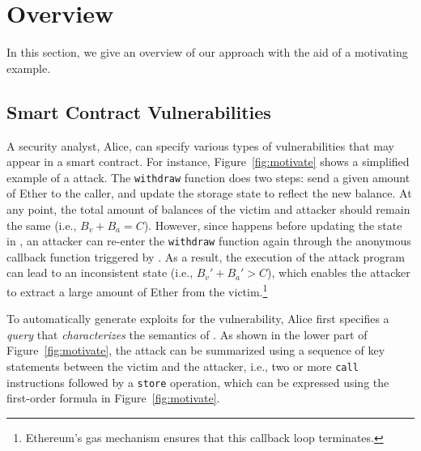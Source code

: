 \section{Overview}\label{sec:overview}
In this section, we give an overview of our approach with the aid of a motivating example.

\subsection{Smart Contract Vulnerabilities}\label{sec:overview-vul}

A security analyst, Alice, can specify various types of vulnerabilities that may appear
in a smart contract. 
For instance, Figure~\ref{fig:motivate} shows a simplified example of a
\reentrancy attack. The \texttt{withdraw} function does two
steps:  send a given amount of Ether to the caller, and 
update the storage state to reflect the new balance. At any point, the total
amount of balances of the victim and attacker should remain the same (i.e.,
$B_v+B_a=C$). However, since  happens before updating the state in
, an attacker can re-enter the \texttt{withdraw} function again
through the anonymous callback function triggered by . As a result,
the execution of the attack program can lead to an inconsistent state (i.e.,
$B_v' + B_a' > C$), which enables the attacker to extract a large amount of
Ether from the victim.\footnote{Ethereum's gas mechanism ensures that this
callback loop terminates.} 

To automatically generate exploits for the \reentrancy vulnerability, Alice
first specifies a \emph{query} that \emph{characterizes} the semantics of
\reentrancy. As shown in the lower part of Figure~\ref{fig:motivate}, the attack
can be summarized using a sequence of key statements between the victim and the
attacker, i.e., two or more \texttt{call} instructions followed by a
\texttt{store} operation, which can be expressed using the first-order
formula in Figure~\ref{fig:motivate}.

